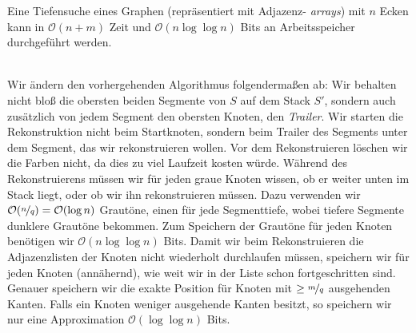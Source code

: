 \documentclass{cheat-sheet}
\renewcommand{\O}{\mathcal{O}} %
\begin{document}

\begin{thm}
  Eine Tiefensuche eines Graphen (repräsentiert mit Adjazenz- \textit{arrays}) mit $n$ Ecken kann in $\O(n+m)$ Zeit und $\O(n \log \log n)$ Bits an Arbeitsspeicher durchgeführt werden.
\end{thm}

\begin{alg} \mbox{}\\
  Wir ändern den vorhergehenden Algorithmus folgendermaßen ab:
  Wir behalten nicht bloß die obersten beiden Segmente von $S$ auf dem Stack $S'$, sondern auch zusätzlich von jedem Segment den obersten Knoten, den \textit{Trailer}.
  Wir starten die Rekonstruktion nicht beim Startknoten, sondern beim Trailer des Segments unter dem Segment, das wir rekonstruieren wollen.
  Vor dem Rekonstruieren löschen wir die Farben nicht, da dies zu viel Laufzeit kosten würde.
  Während des Rekonstruierens müssen wir für jeden graue Knoten wissen, ob er weiter unten im Stack liegt, oder ob wir ihn rekonstruieren müssen.
  Dazu verwenden wir $\O(\nicefrac{n}{q}) = \O(\log n)$ Grautöne, einen für jede Segmenttiefe, wobei tiefere Segmente dunklere Grautöne bekommen.
  Zum Speichern der Grautöne für jeden Knoten benötigen wir $\O(n \log \log n)$ Bits.
  Damit wir beim Rekonstruieren die Adjazenzlisten der Knoten nicht wiederholt durchlaufen müssen, speichern wir für jeden Knoten (annähernd), wie weit wir in der Liste schon fortgeschritten sind.
  Genauer speichern wir die exakte Position für Knoten mit $\geq \nicefrac{m}{q}$ ausgehenden Kanten.
  Falls ein Knoten weniger ausgehende Kanten besitzt, so speichern wir nur eine Approximation $\O(\log \log n)$ Bits.
\end{alg}


\end{document}
